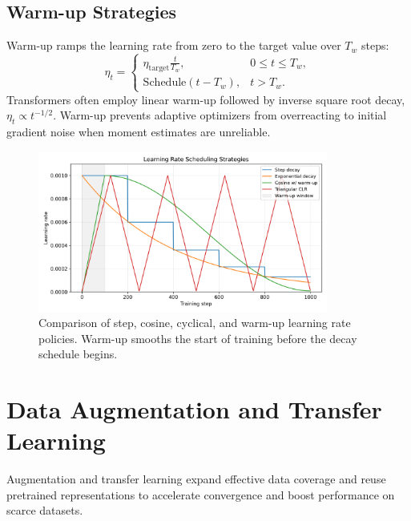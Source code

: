 \documentclass{article}
\begin{document}
\subsection{Warm-up Strategies}
Warm-up ramps the learning rate from zero to the target value over $T_w$ steps:
\begin{equation}
  \eta_t =
  \begin{cases}
    \eta_{\mathrm{target}} \frac{t}{T_w}, & 0 \le t \le T_w, \\
    \text{Schedule}(t - T_w), & t > T_w.
  \end{cases}
\end{equation}
Transformers often employ linear warm-up followed by inverse square root decay, $\eta_t \propto t^{-1/2}$. Warm-up prevents adaptive optimizers from overreacting to initial gradient noise when moment estimates are unreliable.

\begin{figure}[H]
  \centering
  \includegraphics[width=0.85\textwidth]{learning_rate_policies.png}
  \caption{Comparison of step, cosine, cyclical, and warm-up learning rate policies. Warm-up smooths the start of training before the decay schedule begins.}
  \label{fig:learning_rate_policies}
\end{figure}
\FloatBarrier

\section{Data Augmentation and Transfer Learning}
Augmentation and transfer learning expand effective data coverage and reuse pretrained representations to accelerate convergence and boost performance on scarce datasets.
\end{document}
